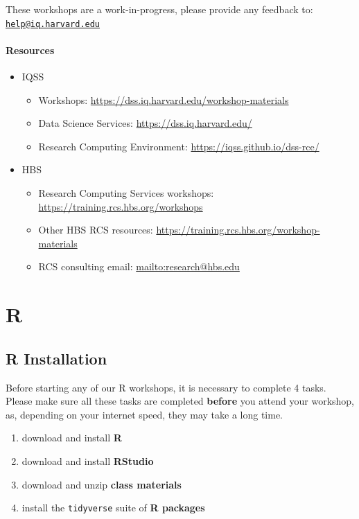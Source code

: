 \documentclass[
]{book}
\providecommand{\tightlist}{%
  \setlength{\itemsep}{0pt}\setlength{\parskip}{0pt}}
\begin{document}
These workshops are a work-in-progress, please provide any feedback to: \href{mailto:help@iq.harvard.edu}{\nolinkurl{help@iq.harvard.edu}}

\hypertarget{resources}{%
\subsection{Resources}\label{resources}}

\begin{itemize}
\tightlist
\item
  IQSS

  \begin{itemize}
  \tightlist
  \item
    Workshops: \url{https://dss.iq.harvard.edu/workshop-materials}
  \item
    Data Science Services: \url{https://dss.iq.harvard.edu/}
  \item
    Research Computing Environment: \url{https://iqss.github.io/dss-rce/}
  \end{itemize}
\item
  HBS

  \begin{itemize}
  \tightlist
  \item
    Research Computing Services workshops: \url{https://training.rcs.hbs.org/workshops}
  \item
    Other HBS RCS resources: \url{https://training.rcs.hbs.org/workshop-materials}
  \item
    RCS consulting email: \url{mailto:research@hbs.edu}
  \end{itemize}
\end{itemize}

\hypertarget{part-r}{%
\part{R}\label{part-r}}

\hypertarget{r-installation}{%
\chapter{R Installation}\label{r-installation}}

Before starting any of our R workshops, it is necessary to complete 4 tasks. Please make sure all these tasks are completed \textbf{before} you attend your workshop, as, depending on your internet speed, they may take a long time.

\begin{enumerate}
\def\labelenumi{\arabic{enumi}.}
\tightlist
\item
  download and install \textbf{R}
\item
  download and install \textbf{RStudio}
\item
  download and unzip \textbf{class materials}
\item
  install the \texttt{tidyverse} suite of \textbf{R packages}
\end{enumerate}
\end{document}
